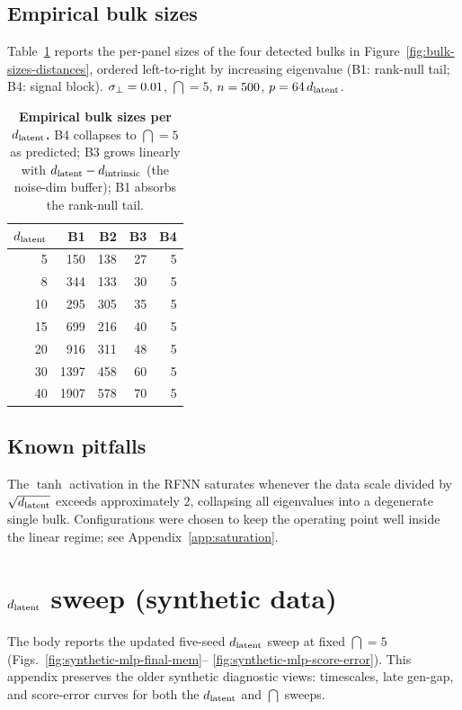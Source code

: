 \subsection{Empirical bulk sizes}
\label{app:bulk-sizes}
Table~\ref{tab:bulk-sizes} reports the per-panel sizes of the four
detected bulks in Figure~\ref{fig:bulk-sizes-distances}, ordered
left-to-right by increasing eigenvalue (B1: rank-null tail; B4:
signal block). $\sigma_{\perp} = 0.01$, $\dint = 5$, $n = 500$,
$p = 64\,d_{\mathrm{latent}}$.

\begin{table}[!t]
\centering\small
\setlength{\tabcolsep}{6pt}
\caption{\textbf{Empirical bulk sizes per $d_{\mathrm{latent}}$.} B4 collapses to
$\dint = 5$ as predicted; B3 grows linearly with $d_{\mathrm{latent}} - d_{\mathrm{intrinsic}}$
(the noise-dim buffer); B1 absorbs the rank-null tail.}
\label{tab:bulk-sizes}
\begin{tabular}{@{}rrrrr@{}}
\toprule
$d_{\mathrm{latent}}$ & B1 & B2 & B3 & B4 \\
\midrule
5  & 150  & 138 & 27 & 5 \\
8  & 344  & 133 & 30 & 5 \\
10 & 295  & 305 & 35 & 5 \\
15 & 699  & 216 & 40 & 5 \\
20 & 916  & 311 & 48 & 5 \\
30 & 1397 & 458 & 60 & 5 \\
40 & 1907 & 578 & 70 & 5 \\
\bottomrule
\end{tabular}
\end{table}

\subsection{Known pitfalls}
The $\tanh$ activation in the RFNN saturates whenever the data scale
divided by $\sqrt{d_{\mathrm{latent}}}$ exceeds approximately $2$, collapsing all
eigenvalues into a degenerate single bulk. Configurations were chosen to
keep the operating point well inside the linear regime; see
Appendix~\ref{app:saturation}.


\section{$d_{\mathrm{latent}}$ sweep (synthetic data)}
\label{app:mlp-dlat-sweep}

The body reports the updated five-seed $d_{\mathrm{latent}}$ sweep at fixed
$\dint=5$ (Figs.~\ref{fig:synthetic-mlp-final-mem}--
\ref{fig:synthetic-mlp-score-error}). This appendix preserves the
older synthetic diagnostic views: timescales, late gen-gap, and
score-error curves for both the $d_{\mathrm{latent}}$ and $\dint$ sweeps.

